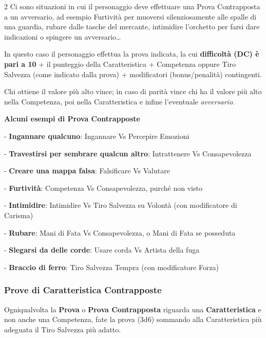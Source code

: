 \begin{multicols}{2}
Ci sono situazioni in cui il personaggio deve effettuare una Prova Contrapposta a un avversario, ad esempio Furtività per muoversi silenziosamente alle spalle di una guardia, rubare dalle tasche del mercante, intimidire l'orchetto per farsi dare indicazioni o spingere un avversario…

In questo caso il personaggio effettua la prova indicata, la cui \textbf{difficoltà (DC) è pari a 10} + il punteggio della Caratteristica + Competenza oppure Tiro Salvezza (come indicato dalla prova) + modificatori (bonus/penalità) contingenti.

Chi ottiene il valore più alto vince; in caso di parità vince chi ha il valore più alto nella Competenza, poi nella Caratteristica e infine l'eventuale \emph{avversario}. 

\medskip

\textbf{Alcuni esempi di Prova Contrapposte}

\begin{description}[noitemsep, topsep=0pt, parsep=0pt, partopsep=0pt, leftmargin=0cm]
\item - \textbf{Ingannare qualcuno}: Ingannare Vs Percepire Emozioni
\item - \textbf{Travestirsi per sembrare qualcun altro}: Intrattenere Vs Consapevolezza
\item - \textbf{Creare una mappa falsa}: Falsificare Vs Valutare
\item - \textbf{Furtività}: Competenza Vs Consapevolezza, purché non visto
\item - \textbf{Intimidire}: Intimidire Vs Tiro Salvezza su Volontà (con modificatore di Carisma)
\item - \textbf{Rubare}: Mani di Fata Vs Consapevolezza, o Mani di Fata se posseduta
\item - \textbf{Slegarsi da delle corde}: Usare corda Vs Artista della fuga
\item - \textbf{Braccio di ferro}: Tiro Salvezza Tempra (con modificatore Forza)
\end{description}

\subsubsection{Prove di Caratteristica Contrapposte}

Ogniqualvolta la \textbf{Prova} o \textbf{Prova Contrapposta} riguarda una \textbf{Caratteristica} e non anche una Competenza, fate la prova (3d6) sommando alla Caratteristica più adeguata il Tiro Salvezza più adatto.


\end{multicols}
